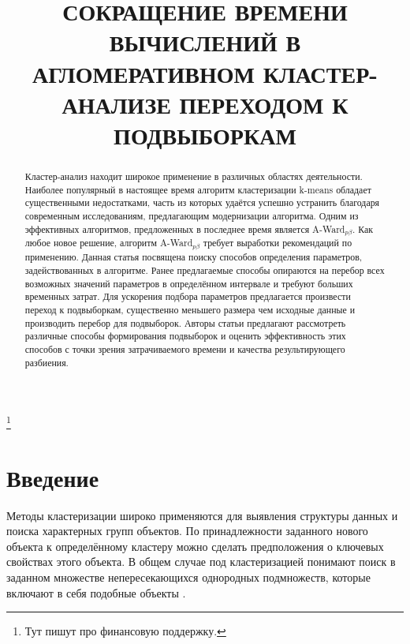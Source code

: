 \documentclass[12pt]{a&t}
\begin{document}

\title{СОКРАЩЕНИЕ ВРЕМЕНИ ВЫЧИСЛЕНИЙ В АГЛОМЕРАТИВНОМ КЛАСТЕР-АНАЛИЗЕ ПЕРЕХОДОМ К ПОДВЫБОРКАМ}
\thanks{Тут пишут про финансовую поддержку.}


\maketitle

\begin{abstract}
Кластер-анализ находит широкое применение в различных областях деятельности. Наиболее популярный в настоящее время алгоритм кластеризации \mbox{k-means} обладает существенными недостатками, часть из которых удаётся успешно устранить благодаря современным исследованиям, предлагающим модернизации алгоритма. Одним из эффективных алгоритмов, предложенных в последнее время является \mbox{A-Ward$ _{p\beta} $}. Как любое новое решение, алгоритм \mbox{A-Ward$ _{p\beta} $} требует выработки рекомендаций по применению. Данная статья посвящена поиску способов определения параметров, задействованных в алгоритме. Ранее предлагаемые способы опираются на перебор всех возможных значений параметров в определённом интервале и требуют больших временных затрат. Для ускорения подбора параметров предлагается произвести переход к подвыборкам, существенно меньшего размера чем исходные данные и производить перебор для подвыборок. Авторы статьи предлагают рассмотреть различные способы формирования подвыборок и оценить эффективность этих способов с точки зрения затрачиваемого времени и качества результирующего разбиения.
\end{abstract}


\section{Введение}

Методы кластеризации широко применяются для выявления структуры данных и поиска характерных групп объектов. По принадлежности заданного нового объекта к определённому кластеру можно сделать предположения о ключевых свойствах этого объекта. В общем случае под кластеризацией понимают  поиск в заданном множестве  непересекающихся однородных подмножеств, которые включают в себя подобные объекты \cite{Mirkin-Vvedenie-v-analiz-dannyh}.
 
\end{document}
